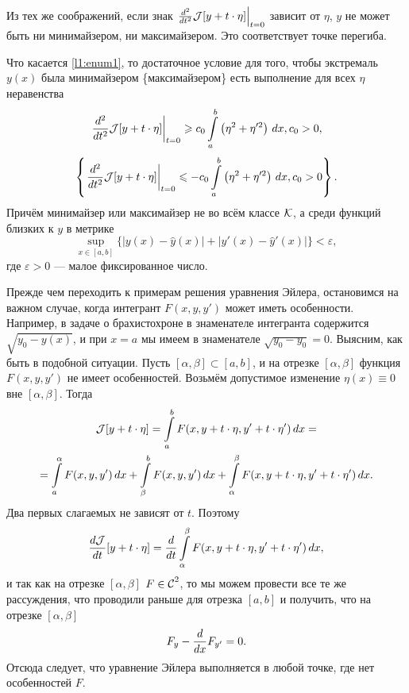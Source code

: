 Из тех же соображений, если знак $\left.\dder{}{t}\J[y+t\cdot\eta]\right|_{t=0}$ зависит от $\eta$,  $y$ не может быть ни минимайзером, ни максимайзером. Это соответствует точке перегиба.   

Что касается \ref{l1:enum1}, то достаточное условие для того, чтобы экстремаль $y(x)$ была минимайзером \{максимайзером\} есть выполнение для всех $\eta$ неравенства
\begin{equation*}
	\left.\dder{}{t}\J[y+t\cdot\eta]\right|_{t=0}\geqslant c_0\int\limits_a^b\left(\eta^2+\eta^{\prime 2}\right)\,\dd{x}, c_0>0,
\end{equation*}
\begin{equation*}
	\left\{\left.\dder{}{t}\J[y+t\cdot\eta]\right|_{t=0}\leqslant -c_0\int\limits_a^b\left(\eta^2+\eta^{\prime 2}\right)\,\dd{x}, c_0>0\right\}.
\end{equation*} 
Причём минимайзер или максимайзер  не во всём классе $\mc{K}$, а среди функций близких к $y$ в метрике
\begin{equation*}
	\sup\limits_{x\in{[a,b]}}\{|y(x)-\hat{y}(x)|+|y'(x)-\hat{y}'(x)|\}<\varepsilon,
\end{equation*} 
где $\varepsilon>0$ --- малое фиксированное число.

Прежде чем переходить к примерам решения уравнения Эйлера, остановимся на важном случае, когда интегрант $F(x,y,y')$ может иметь особенности. Например, в задаче о брахистохроне в знаменателе интегранта содержится $\sqrt{y_0-y(x)}$, и при $x=a$ мы имеем в знаменателе $\sqrt{y_0-y_0}=0$. Выясним, как быть в подобной ситуации. Пусть $[\alpha,\beta]\subset[a,b]$, и на отрезке $[\alpha,\beta]$ функция $F(x,y,y')$ не имеет особенностей. Возьмём допустимое изменение $\eta(x)\equiv0$ вне $[\alpha,\beta]$. Тогда 
\begin{multline*}
	\J[y+t\cdot\eta]=\int\limits_a^b F(x,y+t\cdot\eta,y'+t\cdot\eta')\,\dd{x}=\\=\int\limits_a^\alpha F(x,y,y')\,\dd{x}+\int\limits_{\beta}^b F(x,y,y')\,\dd{x}+\int\limits_{\alpha}^{\beta} F(x,y+t\cdot\eta,y'+t\cdot\eta')\,\dd{x}.
\end{multline*} 
Два первых слагаемых не зависят от $t$. Поэтому
\begin{equation*}
	\der{\J}{t}[y+t\cdot\eta]=\der{}{t}\int\limits_{\alpha}^{\beta} F(x,y+t\cdot\eta,y'+t\cdot\eta')\,\dd{x},
\end{equation*} 
и так как на отрезке $[\alpha,\beta]$ $F\in\Cfn[]{2}$, то мы можем провести все те же рассуждения, что проводили раньше для отрезка $[a,b]$ и получить, что на отрезке $[\alpha,\beta]$
\begin{equation*}
	F_y-\der{}{x}F_{y'}=0.
\end{equation*} 
Отсюда следует, что уравнение Эйлера выполняется в любой точке, где нет особенностей $F$. 

